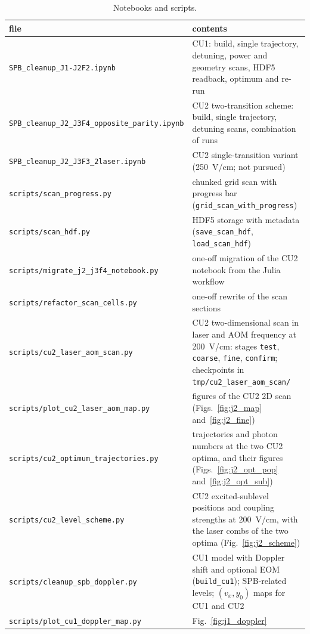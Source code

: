 \documentclass[11pt,a4paper,oneside]{report}
\newcommand{\code}[1]{\texttt{#1}}
\begin{document}
\begin{table}[htbp]
  \centering
  \caption{Notebooks and scripts.}
  \label{tab:code}
  \small
  \begin{tabularx}{\textwidth}{lL}
    \toprule
    file & contents \\
    \midrule
    \code{SPB\_cleanup\_J1-J2F2.ipynb} & CU1: build, single trajectory, detuning,
      power and geometry scans, HDF5 readback, optimum and re-run \\
    \code{SPB\_cleanup\_J2\_J3F4\_opposite\_parity.ipynb} & CU2 two-transition scheme:
      build, single trajectory, detuning scans, combination of runs \\
    \code{SPB\_cleanup\_J2\_J3F3\_2laser.ipynb} & CU2 single-transition variant
      (\SI{250}{V/cm}; not pursued) \\
    \code{scripts/scan\_progress.py} & chunked grid scan with progress bar
      (\code{grid\_scan\_with\_progress}) \\
    \code{scripts/scan\_hdf.py} & HDF5 storage with metadata (\code{save\_scan\_hdf},
      \code{load\_scan\_hdf}) \\
    \code{scripts/migrate\_j2\_j3f4\_notebook.py} & one-off migration of the CU2 notebook
      from the Julia workflow \\
    \code{scripts/refactor\_scan\_cells.py} & one-off rewrite of the scan sections \\
    \code{scripts/cu2\_laser\_aom\_scan.py} & CU2 two-dimensional scan in laser and AOM frequency
      at \SI{200}{V/cm}: stages \code{test}, \code{coarse}, \code{fine}, \code{confirm};
      checkpoints in \code{tmp/cu2\_laser\_aom\_scan/} \\
    \code{scripts/plot\_cu2\_laser\_aom\_map.py} & figures of the CU2 2D scan
      (Figs.~\ref{fig:j2_map} and~\ref{fig:j2_fine}) \\
    \code{scripts/cu2\_optimum\_trajectories.py} & trajectories and photon numbers at the two CU2
      optima, and their figures (Figs.~\ref{fig:j2_opt_pop} and~\ref{fig:j2_opt_sub}) \\
    \code{scripts/cu2\_level\_scheme.py} & CU2 excited-sublevel positions and coupling strengths
      at \SI{200}{V/cm}, with the laser combs of the two optima (Fig.~\ref{fig:j2_scheme}) \\
    \code{scripts/cleanup\_spb\_doppler.py} & CU1 model with Doppler shift and optional EOM
      (\code{build\_cu1}); SPB-related levels; $(v_x,y_0)$ maps for CU1 and CU2 \\
    \code{scripts/plot\_cu1\_doppler\_map.py} & Fig.~\ref{fig:j1_doppler} \\

\end{tabularx}
\end{table}
\end{document}
